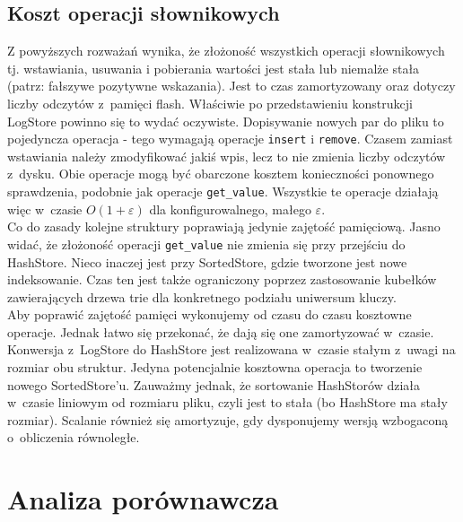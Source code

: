 \documentclass[declaration,shortabstract,masc]{iithesis}
\begin{document}
		\section{Koszt operacji słownikowych}
			Z powyższych rozważań wynika, że złożoność wszystkich operacji słownikowych tj. wstawiania, usuwania i pobierania wartości jest stała lub niemalże stała (patrz: fałszywe pozytywne wskazania). Jest to czas zamortyzowany oraz dotyczy liczby odczytów z~pamięci flash. Właściwie po przedstawieniu konstrukcji LogStore powinno się to wydać oczywiste. Dopisywanie nowych par do pliku to pojedyncza operacja - tego wymagają operacje \texttt{insert} i \texttt{remove}. Czasem zamiast wstawiania należy zmodyfikować jakiś wpis, lecz to nie zmienia liczby odczytów z~dysku. Obie operacje mogą być obarczone kosztem konieczności ponownego sprawdzenia, podobnie jak operacje \texttt{get\_value}. Wszystkie te operacje działają więc w~czasie $O(1+\varepsilon)$ dla konfigurowalnego, małego $\varepsilon$.\\
			\indent Co do zasady kolejne struktury poprawiają jedynie zajętość pamięciową. Jasno widać, że złożoność operacji \texttt{get\_value} nie zmienia się przy przejściu do HashStore. Nieco inaczej jest przy SortedStore, gdzie tworzone jest nowe indeksowanie. Czas ten jest także ograniczony poprzez zastosowanie kubełków zawierających drzewa trie dla konkretnego podziału uniwersum kluczy.\\
			\indent Aby poprawić zajętość pamięci wykonujemy od czasu do czasu kosztowne operacje. Jednak łatwo się przekonać, że dają się one zamortyzować w~czasie. Konwersja z~LogStore do HashStore jest realizowana w~czasie stałym z~uwagi na rozmiar obu struktur. Jedyna potencjalnie kosztowna operacja to tworzenie nowego SortedStore'u. Zauważmy jednak, że sortowanie HashStorów działa w~czasie liniowym od rozmiaru pliku, czyli jest to stała (bo HashStore ma stały rozmiar). Scalanie również się amortyzuje, gdy dysponujemy wersją wzbogaconą o~obliczenia równoległe.
	\chapter{Analiza porównawcza}
\end{document}
